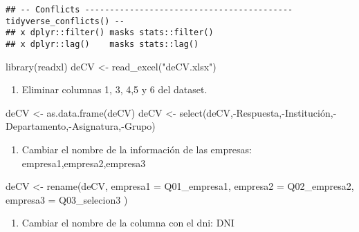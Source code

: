 \documentclass[
]{book}
\newenvironment{Shaded}{\begin{snugshade}}{\end{snugshade}}
\newcommand{\AttributeTok}[1]{\textcolor[rgb]{0.77,0.63,0.00}{#1}}
\newcommand{\FunctionTok}[1]{\textcolor[rgb]{0.00,0.00,0.00}{#1}}
\newcommand{\NormalTok}[1]{#1}
\newcommand{\OtherTok}[1]{\textcolor[rgb]{0.56,0.35,0.01}{#1}}
\newcommand{\SpecialCharTok}[1]{\textcolor[rgb]{0.00,0.00,0.00}{#1}}
\newcommand{\StringTok}[1]{\textcolor[rgb]{0.31,0.60,0.02}{#1}}
\providecommand{\tightlist}{%
  \setlength{\itemsep}{0pt}\setlength{\parskip}{0pt}}
\begin{document}
\begin{verbatim}
## -- Conflicts ------------------------------------------ tidyverse_conflicts() --
## x dplyr::filter() masks stats::filter()
## x dplyr::lag()    masks stats::lag()
\end{verbatim}

\begin{Shaded}
\begin{Highlighting}[]
\FunctionTok{library}\NormalTok{(readxl)}
\NormalTok{deCV }\OtherTok{\textless{}{-}} \FunctionTok{read\_excel}\NormalTok{(}\StringTok{"deCV.xlsx"}\NormalTok{)}
\end{Highlighting}
\end{Shaded}

\begin{enumerate}
\def\labelenumi{\arabic{enumi}.}
\tightlist
\item
  Eliminar columnas 1, 3, 4,5 y 6 del dataset.
\end{enumerate}

\begin{Shaded}
\begin{Highlighting}[]
\NormalTok{deCV }\OtherTok{\textless{}{-}} \FunctionTok{as.data.frame}\NormalTok{(deCV)}
\NormalTok{deCV }\OtherTok{\textless{}{-}} \FunctionTok{select}\NormalTok{(deCV,}\SpecialCharTok{{-}}\NormalTok{Respuesta,}\SpecialCharTok{{-}}\NormalTok{Institución,}\SpecialCharTok{{-}}\NormalTok{Departamento,}\SpecialCharTok{{-}}\NormalTok{Asignatura,}\SpecialCharTok{{-}}\NormalTok{Grupo)}
\end{Highlighting}
\end{Shaded}

\begin{enumerate}
\def\labelenumi{\arabic{enumi}.}
\setcounter{enumi}{1}
\tightlist
\item
  Cambiar el nombre de la información de las empresas: empresa1,empresa2,empresa3
\end{enumerate}

\begin{Shaded}
\begin{Highlighting}[]
\NormalTok{deCV }\OtherTok{\textless{}{-}} \FunctionTok{rename}\NormalTok{(deCV, }\AttributeTok{empresa1 =}\NormalTok{ Q01\_empresa1, }\AttributeTok{empresa2 =}\NormalTok{ Q02\_empresa2, }\AttributeTok{empresa3 =}\NormalTok{ Q03\_selecion3 )}
\end{Highlighting}
\end{Shaded}

\begin{enumerate}
\def\labelenumi{\arabic{enumi}.}
\setcounter{enumi}{2}
\tightlist
\item
  Cambiar el nombre de la columna con el dni: DNI
\end{enumerate}
\end{document}
